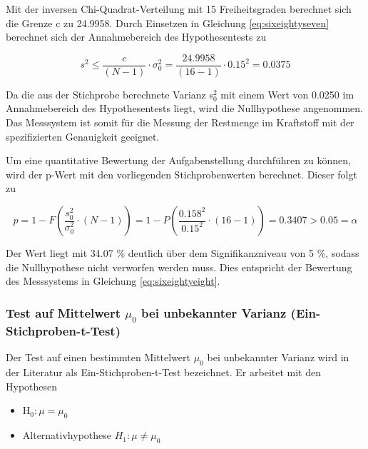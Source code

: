\noindent Mit der inversen Chi-Quadrat-Verteilung mit 15 Freiheitsgraden berechnet sich die Grenze c zu 24.9958. Durch Einsetzen in Gleichung \eqref{eq:sixeightyseven} berechnet sich der Annahmebereich des Hypothesentests zu

\begin{equation}\label{eq:sixeightyeight}
s^{2} \le \dfrac{c}{\left(N-1\right)} \cdot \sigma _{0}^{2} =\dfrac{24.9958}{\left(16-1\right)} \cdot 0.15^{2} =0.0375
\end{equation}

\noindent Da die aus der Stichprobe berechnete Varianz s$_{0}^{2}$ mit einem Wert von 0.0250 im Annahmebereich des Hypothesentests liegt, wird die Nullhypothese angenommen. Das Messsystem ist somit f\"{u}r die Messung der Restmenge im Kraftstoff mit der spezifizierten Genauigkeit geeignet.\newline

\noindent Um eine quantitative Bewertung der Aufgabenstellung durchf\"{u}hren zu k\"{o}nnen, wird der p-Wert mit den vorliegenden Stichprobenwerten berechnet. Dieser folgt zu

\begin{equation}\label{eq:sixeightynine}
p=1-F\left(\dfrac{s_{0}^{2} }{\sigma _{0}^{2}} \cdot (N-1)\right)=1-P\left(\dfrac{0.158^{2}}{0.15^{2}} \cdot (16-1)\right)=0.3407>0.05=\alpha
\end{equation}

\noindent Der Wert liegt mit 34.07 \% deutlich \"{u}ber dem Signifikanzniveau von 5 \%, sodass die Nullhypothese nicht verworfen werden muss. Dies entspricht der Bewertung des Messsystems in Gleichung \eqref{eq:sixeightyeight}.

\subsubsection{Test auf Mittelwert \texorpdfstring{$\mu_{0}$}{Lg} bei unbekannter Varianz (Ein-Stichproben-t-Test)}

\noindent Der Test auf einen bestimmten Mittelwert $\mu_{0}$ bei unbekannter Varianz wird in der Literatur als Ein-Stichproben-t-Test bezeichnet. Er arbeitet mit den Hypothesen

\begin{itemize}
    \item H$_{0} : \mu = \mu_{0}$
    \item Alternativhypothese $H_{1} : \mu \neq \mu_{0}$
\end{itemize}

